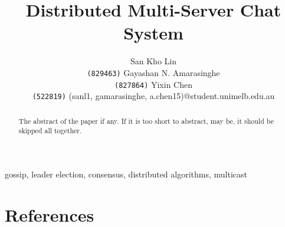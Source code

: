 \documentclass[11pt]{article}
\title{Distributed Multi-Server Chat System}
\author{San Kho Lin \\ \texttt{(829463)} \And
Gayashan N. Amarasinghe \\ \texttt{(827864)} \And
Yixin Chen \\ \texttt{(522819)} \AND
(sanl1, gamarasinghe, a.chen15)@student.unimelb.edu.au}
\begin{document}
\maketitle



\begin{abstract}
The abstract of the paper if any. If it is too short to abstract, may be, it should be skipped all together.
\end{abstract}
     
\begin{keywords} 
gossip, leader election, consensus, distributed algorithms, multicast
\end{keywords}












\newpage



\newpage



\newpage

\section{References}
\printbibliography[heading=none]

\newpage


\end{document}
